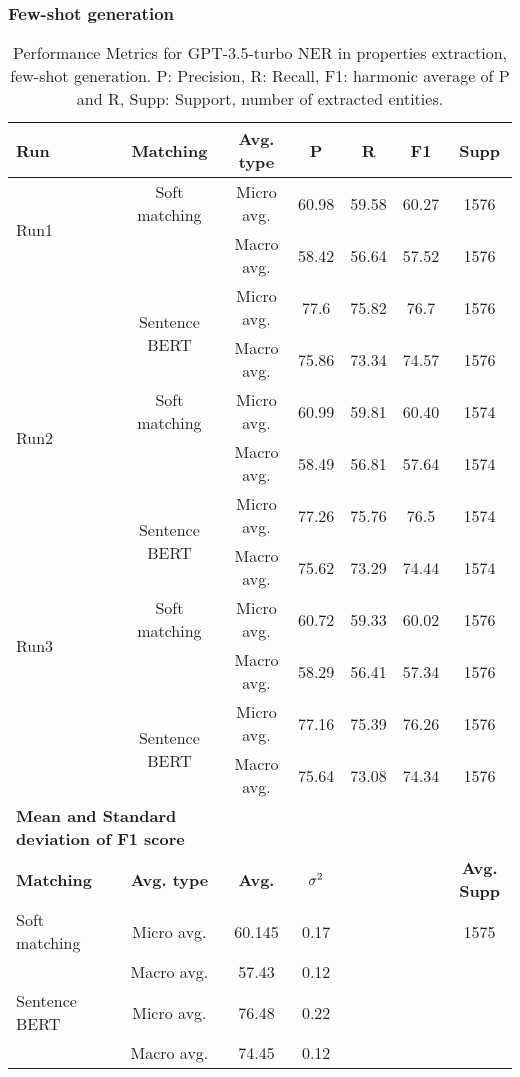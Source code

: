 \clearpage


\subsubsection{Few-shot generation }

\begin{table}[htbp]
\small
  \centering
  \caption{Performance Metrics for GPT-3.5-turbo NER in properties extraction, few-shot generation. P: Precision, R: Recall, F1: harmonic average of P and R, Supp: Support, number of extracted entities.}
  \begin{tabular}{lcccccc}
    \toprule
    \textbf{Run} & \textbf{Matching} & \textbf{Avg. type} & \textbf{P} & \textbf{R} & \textbf{F1} & \textbf{Supp} \\
    \midrule
    \multirow{2}{*}{Run1} & Soft matching & Micro avg. & 60.98 & 59.58 & 60.27 & 1576 \\
    & & Macro avg. & 58.42 & 56.64 & 57.52 & 1576 \\
    \cmidrule{2-7}
    & \multirow{2}{*}{Sentence BERT} & Micro avg. & 77.6 & 75.82 & 76.7 & 1576 \\
    & & Macro avg. & 75.86 & 73.34 & 74.57 & 1576 \\
    \midrule
    \multirow{2}{*}{Run2} & Soft matching & Micro avg. & 60.99 & 59.81 & 60.40 & 1574 \\
    & & Macro avg. & 58.49 & 56.81 & 57.64 & 1574 \\
    \cmidrule{2-7}
    & \multirow{2}{*}{Sentence BERT} & Micro avg. & 77.26 & 75.76 & 76.5 & 1574 \\
    & & Macro avg. & 75.62 & 73.29 & 74.44 & 1574 \\
    \midrule
    \multirow{2}{*}{Run3} & Soft matching & Micro avg. & 60.72 & 59.33 & 60.02 & 1576 \\
    & & Macro avg. & 58.29 & 56.41 & 57.34 & 1576 \\
    \cmidrule{2-7}
    & \multirow{2}{*}{Sentence BERT} & Micro avg. & 77.16 & 75.39 & 76.26 & 1576 \\
    & & Macro avg. & 75.64 & 73.08 & 74.34 & 1576 \\
        \midrule
    \multicolumn{2}{l}{\textbf{Mean and Standard deviation of F1 score}} & & & & & \\
    \midrule
    \textbf{Matching} & \textbf{Avg. type} & \textbf{Avg.} & $\sigma\textsuperscript{2}$ & & & \textbf{Avg. Supp}\\
    Soft matching & Micro avg. & 60.145 & 0.17 & & & 1575 \\
    & Macro avg. & 57.43 & 0.12 & & & \\
    Sentence BERT & Micro avg. & 76.48 & 0.22 & & & \\
    & Macro avg. & 74.45 & 0.12 & & & \\
    \bottomrule
  \end{tabular}
\end{table}

